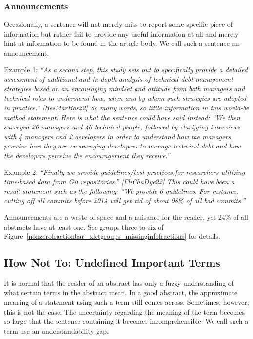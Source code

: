 \documentclass[10pt,journal,compsoc]{IEEEtran}
\newcommand{\Art}[1]{\bgroup[#1]\egroup} %
\newcommand{\Quote}[1]{\bgroup\itshape ``#1''\egroup}  %
\newcommand{\Pseudoquote}[1]{\bgroup\itshape ``#1''\egroup}  %
\begin{document}
\subsubsection{Announcements}

Occasionally, a sentence will not merely miss to report some specific piece of information
but rather fail to provide any useful information at all and merely hint at
information to be found in the article body.
We call such a sentence an announcement.

Example 1:
\Quote{As a second step, this study sets out to specifically
  provide a detailed assessment of additional and in-depth analysis of technical debt management strategies based
  on an encouraging mindset and attitude from both managers and technical roles to understand how, when and by
  whom such strategies are adopted in practice.} \Art{BesMarBos22}
So many words, so little information in this would-be method statement!
Here is what the sentence could have said instead:
\Pseudoquote{We then surveyed 26 managers and 46 technical people, followed by clarifying interviews
  with 4 managers and 2 developers in order to understand how the managers perceive how they are encouraging
  developers to manage technical debt and how the developers perceive the encouragement they receive.}

Example 2:
\Quote{Finally we provide guidelines/best practices for researchers utilizing time-based data
from Git repositories.} \Art{FliChaDye22}  %
This could have been a result statement such as the following:
\Pseudoquote{We provide 6 guidelines. For instance, cutting off all commits before 2014
  will get rid of about 98\% of all bad commits.}

Announcements are a waste of space and a nuisance for the reader,
yet 24\% of all abstracts have at least one.
See groups three to six of Figure~\ref{nonzerofractionbar_xletgroups_missinginfofractions}
for details.


\subsection{How Not To: Undefined Important Terms}

It is normal that the reader of an abstract has only a fuzzy understanding
of what certain terms in the abstract mean.
In a good abstract, the approximate meaning of a statement using such a term
still comes across.
Sometimes, however, this is not the case:
The uncertainty regarding the meaning of the term becomes so large
that the sentence containing it becomes incomprehensible.
We call such a term use an understandability gap.
\end{document}
